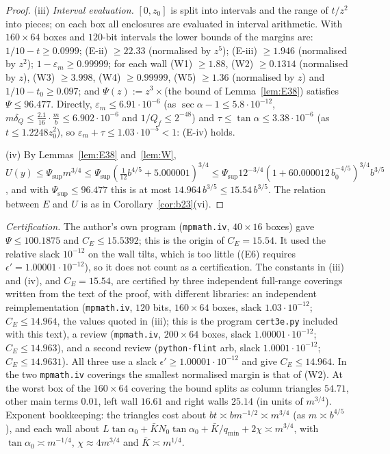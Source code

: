 \documentclass[11pt]{amsart}
\newcommand{\ta}{\tan\alpha}
\newcommand{\se}{\sec\alpha}
\newcommand{\taz}{\tan\alpha_0}
\newcommand{\Kb}{\bar K}
\theoremstyle{definition}
\theoremstyle{remark}
\numberwithin{equation}{section}
\begin{document}
\begin{proof}
(iii) \emph{Interval evaluation.} $[0,z_0]$ is split into intervals and the range of $t/z^2$ into pieces; on each box
all enclosures are evaluated in interval arithmetic. With $160\times64$ boxes and $120$-bit intervals the lower bounds of
the margins are: $1/10-t\ge0.0999$; (E-ii) $\ge22.33$ (normalised by $z^5$); (E-iii) $\ge1.946$ (normalised by $z^2$);
$1-\varepsilon_m\ge0.99999$; for each wall (W1) $\ge1.88$, (W2) $\ge0.1314$ (normalised by $z$), (W3) $\ge3.998$, (W4)
$\ge0.99999$, (W5) $\ge1.36$ (normalised by $z$) and $1/10-t_0\ge0.097$; and $\Psi(z):=z^3\times$(the bound of
Lemma~\ref{lem:E38}) satisfies $\Psi\le96.477$. Directly, $\varepsilon_m\le6.91\cdot10^{-6}$ (as
$\se-1\le5.8\cdot10^{-12}$, $m\delta_Q\le\frac{2.1}{16}\cdot\frac mb\le6.902\cdot10^{-6}$ and $1/Q_f\le2^{-48}$) and
$\tau\le\ta\le3.38\cdot10^{-6}$ (as $t\le1.2248z_0^2$), so $\varepsilon_m+\tau\le1.03\cdot10^{-5}<1$: (E-iv) holds.

(iv) By Lemmas~\ref{lem:E38} and~\ref{lem:W}, $U(y)\le\Psi_{\sup}m^{3/4}\le\Psi_{\sup}(\frac1{12}b^{4/5}+5.000001)^{3/4}
\le\Psi_{\sup}12^{-3/4}(1+60.000012\,b_0^{-4/5})^{3/4}b^{3/5}$, and with $\Psi_{\sup}\le96.477$ this is at most
$14.964\,b^{3/5}\le15.54\,b^{3/5}$. The relation between $E$ and $U$ is as in Corollary~\ref{cor:b23}(vi).
\end{proof}

\emph{Certification.} The author's own program (\texttt{mpmath.iv}, $40\times16$ boxes) gave $\Psi\le100.1875$ and
$C_E\le15.5392$; this is the origin of $C_E=15.54$. It used the relative slack $10^{-12}$ on the wall tilts, which is
too little ((E6) requires $\epsilon'=1.00001\cdot10^{-12}$), so it does not count as a certification. The constants in
(iii) and (iv), and $C_E=15.54$, are certified by three independent full-range coverings written from the text of the
proof, with different libraries: an independent reimplementation (\texttt{mpmath.iv}, $120$ bits, $160\times64$ boxes,
slack $1.03\cdot10^{-12}$; $C_E\le14.964$, the values quoted in (iii); this is the program \texttt{cert3e.py} included
with this text), a review (\texttt{mpmath.iv}, $200\times64$ boxes, slack $1.00001\cdot10^{-12}$; $C_E\le14.963$), and a
second review (\texttt{python-flint} arb, slack $1.0001\cdot10^{-12}$; $C_E\le14.9631$). All three use a slack
$\epsilon'\ge1.00001\cdot10^{-12}$ and give $C_E\le14.964$. In the two \texttt{mpmath.iv} coverings the smallest
normalised margin is that of (W2). At the worst box of the $160\times64$ covering the bound splits as column triangles $54.71$, other main terms
$0.01$, left wall $16.61$ and right walls $25.14$ (in units of $m^{3/4}$). Exponent bookkeeping: the triangles cost about
$bt\asymp bm^{-1/2}\asymp m^{3/4}$ (as $m\asymp b^{4/5}$), and each wall about
$L\taz+\Kb N_0\taz+\Kb/q_{\min}+2\chi\asymp m^{3/4}$, with $\taz\asymp m^{-1/4}$, $\chi\approx4m^{3/4}$ and
$\Kb\asymp m^{1/4}$.
\end{document}
